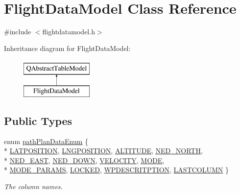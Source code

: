 \hypertarget{class_flight_data_model}{\section{Flight\-Data\-Model Class Reference}
\label{class_flight_data_model}
}


{\ttfamily \#include $<$flightdatamodel.\-h$>$}

Inheritance diagram for Flight\-Data\-Model\-:\begin{figure}[H]
\begin{center}
\leavevmode
\includegraphics[height=2.000000cm]{class_flight_data_model}
\end{center}
\end{figure}
\subsection*{Public Types}
\begin{DoxyCompactItemize}
\item 
enum \hyperlink{group___path_gaa0908516cbd02b164b605fce903d9066}{path\-Plan\-Data\-Enum} \{ \\*
\hyperlink{group___path_ggaa0908516cbd02b164b605fce903d9066a13024b57ed66f819f1bd7a7be0e11547}{L\-A\-T\-P\-O\-S\-I\-T\-I\-O\-N}, 
\hyperlink{group___path_ggaa0908516cbd02b164b605fce903d9066a62e4abf60e84ec15a1d55ccead4a171d}{L\-N\-G\-P\-O\-S\-I\-T\-I\-O\-N}, 
\hyperlink{group___path_ggaa0908516cbd02b164b605fce903d9066a6cb875c2764969992994d66ba514a189}{A\-L\-T\-I\-T\-U\-D\-E}, 
\hyperlink{group___path_ggaa0908516cbd02b164b605fce903d9066a17bce9ec0e6fab7e3abc296781e3acbe}{N\-E\-D\-\_\-\-N\-O\-R\-T\-H}, 
\\*
\hyperlink{group___path_ggaa0908516cbd02b164b605fce903d9066ac273ffece3fb399e96824a7c940fbb66}{N\-E\-D\-\_\-\-E\-A\-S\-T}, 
\hyperlink{group___path_ggaa0908516cbd02b164b605fce903d9066a8132be414bfac5bfc9a86e3fa3c2c4c2}{N\-E\-D\-\_\-\-D\-O\-W\-N}, 
\hyperlink{group___path_ggaa0908516cbd02b164b605fce903d9066a1893f60afdc05d0fc0c762e8f74f6b89}{V\-E\-L\-O\-C\-I\-T\-Y}, 
\hyperlink{group___path_ggaa0908516cbd02b164b605fce903d9066abc9a6ccea3fe42c5fb3b77401f59e3e0}{M\-O\-D\-E}, 
\\*
\hyperlink{group___path_ggaa0908516cbd02b164b605fce903d9066a8c8d56fc223af4d252e65152fbf61c5f}{M\-O\-D\-E\-\_\-\-P\-A\-R\-A\-M\-S}, 
\hyperlink{group___path_ggaa0908516cbd02b164b605fce903d9066acf92b5f5aa8947d83f18ff9d9dbb1681}{L\-O\-C\-K\-E\-D}, 
\hyperlink{group___path_ggaa0908516cbd02b164b605fce903d9066a87ddbd86791c5f58af0900f25ea3e0a7}{W\-P\-D\-E\-S\-C\-R\-I\-T\-P\-T\-I\-O\-N}, 
\hyperlink{group___path_ggaa0908516cbd02b164b605fce903d9066a9a93aeb591b9c29b835458cbbfc825c5}{L\-A\-S\-T\-C\-O\-L\-U\-M\-N}
 \}
\begin{DoxyCompactList}\small\item\em The column names. \end{DoxyCompactList}\end{DoxyCompactItemize}
